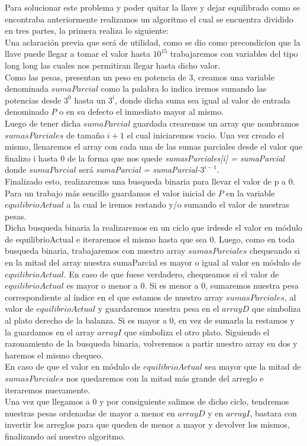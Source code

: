 
Para solucionar este problema y poder quitar la llave y dejar equilibrado como se encontraba anteriormente realizamos un algoritmo el cual se encuentra dividido en tres partes, la primera realiza lo siguiente:\\

Una aclaraci\'on previa que ser\'a de utilidad, como se dio como precondicion que la llave puede llegar a tomar el valor hasta $10^{15}$ trabajaremos con variables del tipo long long las cuales nos permitiran llegar hasta dicho valor.\\

Como las pesas, presentan un peso en potencia de 3, creamos una variable denominada $sumaParcial$ como la palabra lo indica iremos sumando las potencias desde $3^0$ hasta un $3^i$, donde dicha suma sea igual al valor de entrada denominado $P$ o en su defecto el inmediato mayor al mismo.\\

Luego de tener dicha $sumaParcial$ guardada crearemos un array que nombramos $sumasParciales$ de tamaño $i+1$ el cual iniciaremos vacio. Una vez creado el mismo, llenaremos el array con cada una de las sumas parciales desde el valor que finalizo i hasta 0 de la forma que nos quede \textit{sumasParciales[i] = sumaParcial} donde $sumaParcial$ ser\'a \textit{sumaParcial = sumaParcial-$3^{i-1}$}.\\

Finalizado esto, realizaremos una busqueda binaria para llevar el valor de p a 0. Para un trabajo m\'as sencillo guardamos el valor inicial de $P$ en la variable $equilibrioActual$ a la cual le iremos restando y/o sumando el valor de nuestras pesas.\\

Dicha busqueda binaria la realizaremos en un ciclo que ir\a desde el valor en m\'odulo de equilibrioActual e iteraremos el mismo hasta que sea 0. Luego, como en toda busqueda binaria, trabajaremos con nuestro array $sumasParciales$ chequeando si en la mitad del array nuestra sumaParcial es mayor o igual al valor en m\'odulo de $equilibrioActual$. En caso de que fuese verdadero, chequeamos si el valor de $equilibrioActual$ es mayor o menor a 0. Si es menor a 0, sumaremos nuestra pesa correspondiente al \'indice en el que estamos de nuestro array $sumasParciales$, al valor de $equilibrioActual$ y guardaremos nuestra pesa en el $arrayD$ que simboliza al plato derecho de la balanza. Si es mayor a 0, en vez de sumarla la restamos y la guardamos en el array $arrayI$ que simboliza el otro plato. Siguiendo el razonamiento de la busqueda binaria, volveremos a partir nuestro array en dos y haremos el mismo chequeo.\\

En caso de que el valor en m\'odulo de $equilibrioActual$ sea mayor que la mitad de $sumasParciales$ nos quedaremos con la mitad m\'as grande del arreglo e iteraremos nuevamente.\\

Una vez que llegamos a 0 y por consiguiente salimos de dicho ciclo, tendremos nuestras pesas ordenadas de mayor a menor en $arrayD$ y en $arrayI$, bastara con invertir los arreglos para que queden de menor a mayor y devolver los mismos, finalizando as\'i nuestro algoritmo.\\
